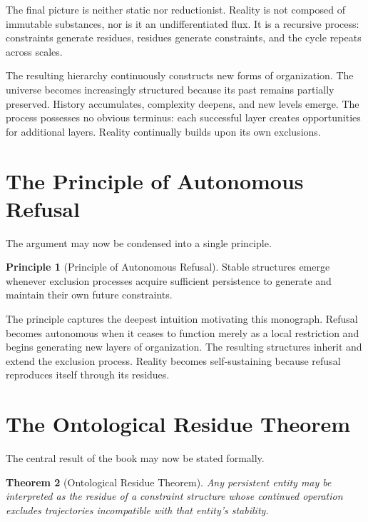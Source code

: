 \documentclass[11pt,oneside]{book}
\theoremstyle{plain}
\newtheorem{theorem}{Theorem}[chapter]
\theoremstyle{definition}
\newtheorem{principle}[theorem]{Principle}
\theoremstyle{remark}
\begin{document}
The final picture is neither static nor reductionist. Reality is not composed of immutable substances, nor is it an undifferentiated flux. It is a recursive process: constraints generate residues, residues generate constraints, and the cycle repeats across scales.

The resulting hierarchy continuously constructs new forms of organization. The universe becomes increasingly structured because its past remains partially preserved. History accumulates, complexity deepens, and new levels emerge. The process possesses no obvious terminus: each successful layer creates opportunities for additional layers. Reality continually builds upon its own exclusions.

\section{The Principle of Autonomous Refusal}

The argument may now be condensed into a single principle.

\begin{principle}[Principle of Autonomous Refusal]
Stable structures emerge whenever exclusion processes acquire sufficient persistence to generate and maintain their own future constraints.
\end{principle}

The principle captures the deepest intuition motivating this monograph. Refusal becomes autonomous when it ceases to function merely as a local restriction and begins generating new layers of organization. The resulting structures inherit and extend the exclusion process. Reality becomes self-sustaining because refusal reproduces itself through its residues.

\section{The Ontological Residue Theorem}

The central result of the book may now be stated formally.

\begin{theorem}[Ontological Residue Theorem]
Any persistent entity may be interpreted as the residue of a constraint structure whose continued operation excludes trajectories incompatible with that entity's stability.
\end{theorem}
\end{document}
